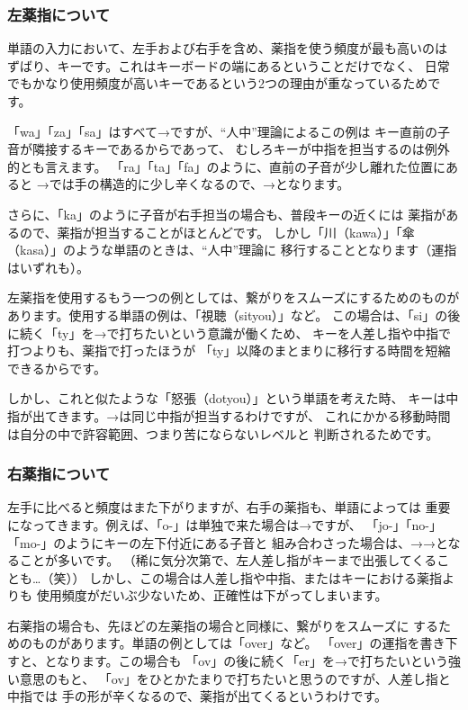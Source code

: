 \subsubsection*{左薬指について}

単語の入力において、左手および右手を含め、薬指を使う頻度が最も高いのは
ずばり、キーです。これはキーボードの端にあるということだけでなく、
日常でもかなり使用頻度が高いキーであるという2つの理由が重なっているためです。

「wa」「za」「sa」はすべて→ですが、“人中”理論によるこの例は
キー直前の子音が隣接するキーであるからであって、
むしろキーが中指を担当するのは例外的とも言えます。
「ra」「ta」「fa」のように、直前の子音が少し離れた位置にあると
→では手の構造的に少し辛くなるので、→となります。

さらに、「ka」のように子音が右手担当の場合も、普段キーの近くには
薬指があるので、薬指が担当することがほとんどです。
しかし「川（kawa）」「傘（kasa）」のような単語のときは、“人中”理論に
移行することとなります（運指はいずれも）。


左薬指を使用するもう一つの例としては、繋がりをスムーズにするためのものが
あります。使用する単語の例は、「視聴（sityou）」など。
この場合は、「si」の後に続く「ty」を→で打ちたいという意識が働くため、
キーを人差し指や中指で打つよりも、薬指で打ったほうが
「ty」以降のまとまりに移行する時間を短縮できるからです。

しかし、これと似たような「怒張（dotyou）」という単語を考えた時、
キーは中指が出てきます。→は同じ中指が担当するわけですが、
これにかかる移動時間は自分の中で許容範囲、つまり苦にならないレベルと
判断されるためです。


\subsubsection*{右薬指について}

左手に比べると頻度はまた下がりますが、右手の薬指も、単語によっては
重要になってきます。例えば、「o-」は単独で来た場合は→ですが、
「jo-」「no-」「mo-」のようにキーの左下付近にある子音と
組み合わさった場合は、→→となることが多いです。
（稀に気分次第で、左人差し指がキーまで出張してくることも…（笑））
しかし、この場合は人差し指や中指、またはキーにおける薬指よりも
使用頻度がだいぶ少ないため、正確性は下がってしまいます。

右薬指の場合も、先ほどの左薬指の場合と同様に、繋がりをスムーズに
するためのものがあります。単語の例としては「over」など。
「over」の運指を書き下すと、となります。この場合も
「ov」の後に続く「er」を→で打ちたいという強い意思のもと、
「ov」をひとかたまりで打ちたいと思うのですが、人差し指と中指では
手の形が辛くなるので、薬指が出てくるというわけです。


